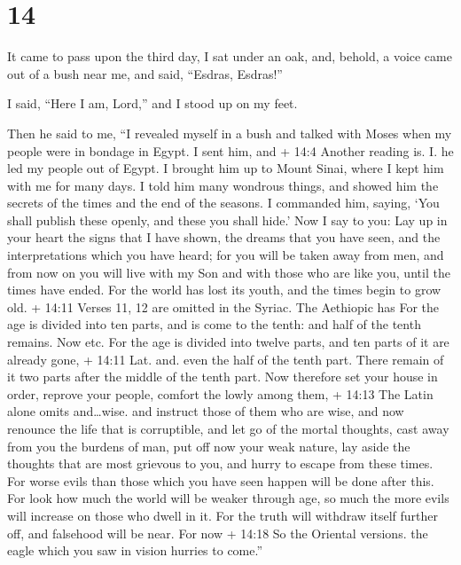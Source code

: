 \hypertarget{section-13}{%
\section{14}\label{section-13}}

 It came to pass upon the third day, I sat under an oak,
and, behold, a voice came out of a bush near me, and said, ``Esdras,
Esdras!''

 I said, ``Here I am, Lord,'' and I stood up on my feet.

 Then he said to me, ``I revealed myself in a bush and
talked with Moses when my people were in bondage in Egypt. 
I sent him, and + 14:4 Another reading is. I. he led my people out of
Egypt. I brought him up to Mount Sinai, where I kept him with me for
many days.  I told him many wondrous things, and showed him
the secrets of the times and the end of the seasons. I commanded him,
saying,  `You shall publish these openly, and these you
shall hide.'  Now I say to you:  Lay up in your
heart the signs that I have shown, the dreams that you have seen, and
the interpretations which you have heard;  for you will be
taken away from men, and from now on you will live with my Son and with
those who are like you, until the times have ended.  For
the world has lost its youth, and the times begin to grow old.
 + 14:11 Verses 11, 12 are omitted in the Syriac. The
Aethiopic has For the age is divided into ten parts, and is come to the
tenth: and half of the tenth remains. Now etc. For the age is divided
into twelve parts, and ten parts of it are already gone, + 14:11 Lat.
and. even the half of the tenth part.  There remain of it
two parts after the middle of the tenth part.  Now
therefore set your house in order, reprove your people, comfort the
lowly among them, + 14:13 The Latin alone omits and\ldots wise. and
instruct those of them who are wise, and now renounce the life that is
corruptible,  and let go of the mortal thoughts, cast away
from you the burdens of man, put off now your weak nature, 
lay aside the thoughts that are most grievous to you, and hurry to
escape from these times.  For worse evils than those which
you have seen happen will be done after this.  For look how
much the world will be weaker through age, so much the more evils will
increase on those who dwell in it.  For the truth will
withdraw itself further off, and falsehood will be near. For now + 14:18
So the Oriental versions. the eagle which you saw in vision hurries to
come.''

